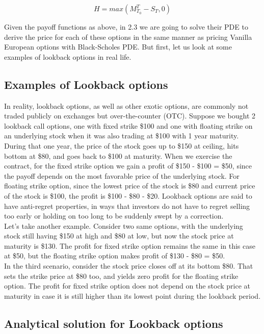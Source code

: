 \documentclass{article}
\begin{document}
\[
H=max(M_{T_0}^T - S_T, 0)
\]

Given the payoff functions as above, in 2.3 we are going to solve their PDE to derive the price for each of these options in the same manner as pricing Vanilla European options with Black-Scholes PDE.
But first, let us look at some examples of lookback options in real life.
\subsection{Examples of Lookback options
}

In reality, lookback options, as well as other exotic options, are commonly not traded publicly on exchanges but over-the-counter (OTC).
Suppose we bought 2 lookback call options, one with fixed strike \$100 and one with floating strike
on an underlying stock when it was also trading at \$100 with 1 year maturity.
During that one year, the price of the stock goes up to \$150 at ceiling, hits bottom at \$80, and goes back to \$100 at maturity.
When we exercise the contract, for the fixed strike option we gain a profit of \$150 - \$100 = \$50,
since the payoff depends on the most favorable price of the underlying stock.
For floating strike option, since the lowest price of the stock is \$80 and current price of the stock is \$100,
the profit is \$100 - \$80 - \$20.
Lookback options are said to have anti-regret properties, in ways that investors do not have to regret
selling too early or holding on too long to be suddenly swept by a correction. \\

Let's take another example. Consider two same options, with the underlying stock still having \$150 at high
and \$80 at low, but now the stock price at maturity is \$130. The profit for fixed strike option remains the
same in this case at \$50, but the floating strike option makes profit of \$130 - \$80 = \$50. \\

In the third scenario, consider the stock price closes off at its bottom \$80. That sets the strike price at \$80 too,
and yields zero profit for the floating strike option. The profit for fixed strike option does not depend on
the stock price at maturity in case it is still higher than its lowest point during the lookback period.
\subsection{Analytical solution for Lookback options
}
\end{document}
